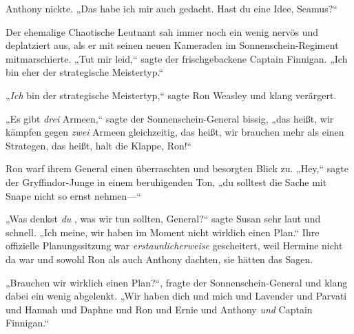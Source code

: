 Anthony nickte. „Das habe ich mir auch gedacht. Hast du eine Idee, Seamus?“

Der ehemalige Chaotische Leutnant sah immer noch ein wenig nervös und deplatziert aus, als er mit seinen neuen Kameraden im Sonnenschein-Regiment mitmarschierte. „Tut mir leid,“ sagte der frischgebackene Captain Finnigan. „Ich bin eher der strategische Meistertyp.“

„\emph{Ich} bin der strategische Meistertyp,“ sagte Ron Weasley und klang verärgert.

„Es gibt \emph{drei} Armeen,“ sagte der Sonnenschein-General bissig, „das heißt, wir kämpfen gegen \emph{zwei} Armeen gleichzeitig, das heißt, wir brauchen mehr als einen Strategen, das heißt, halt die Klappe, Ron!“

Ron warf ihrem General einen überraschten und besorgten Blick zu. „Hey,“ sagte der Gryffindor-Junge in einem beruhigenden Ton, „du solltest die Sache mit Snape nicht so ernst nehmen—“

„Was denkst \emph{du} , was wir tun sollten, General?“ sagte Susan sehr laut und schnell. „Ich meine, wir haben im Moment nicht wirklich einen Plan.“ Ihre offizielle Planungssitzung war \emph{erstaunlicherweise} gescheitert, weil Hermine nicht da war und sowohl Ron als auch Anthony dachten, sie hätten das Sagen.

„Brauchen wir wirklich einen Plan?“, fragte der Sonnenschein-General und klang dabei ein wenig abgelenkt. „Wir haben dich und mich und Lavender und Parvati und Hannah und Daphne und Ron und Ernie und Anthony \emph{und} Captain Finnigan.“


